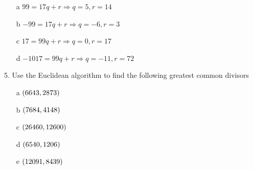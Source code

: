 \begin{mdframed}[style=darkAnswer,frametitle={Joe Starr}]
  \begin{itemize}
    \item [a] {$99=17q+r\Rightarrow q=5, r=14$}
    \item [b] {$-99=17q+r\Rightarrow q=-6, r=3$}
    \item [c] {$17=99q+r\Rightarrow q=0, r=17$}
    \item [d] {$-1017=99q+r\Rightarrow q=-11, r=72$}
  \end{itemize}
\end{mdframed}

\newpage
\begin{mdframed}[style=darkQuesion]
  5.    Use the Euclidean algorithm to find the following greatest common divisors
  \begin{multicols}{2}
    \begin{itemize}
      \item [a] {$\left(6643,2873\right)$}
      \item [b] {$\left(7684,4148\right)$}
      \item [c] {$\left(26460,12600\right)$}
      \item [d] {$\left(6540,1206\right)$}
      \item [e] {$\left(12091,8439\right)$}
    \end{itemize}
  \end{multicols}
\end{mdframed}

